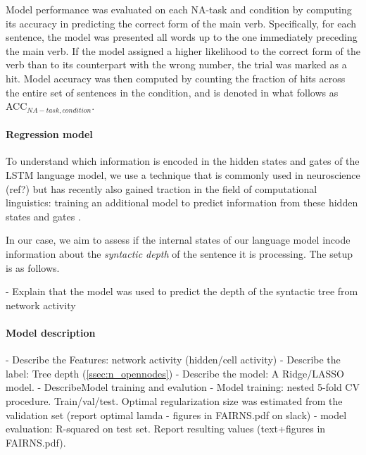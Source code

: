 Model performance was evaluated on each NA-task and condition by computing its accuracy in predicting the correct form of the main verb. Specifically, for each sentence, the model was presented all words up to the one immediately preceding the main verb. If the model assigned a higher likelihood to the correct form of the verb than to its counterpart with the wrong number, the trial was marked as a hit. Model accuracy was then computed by counting the fraction of hits across the entire set of sentences in the condition, and is denoted in what follows as ACC$_{NA-task, condition}$.


\paragraph{Regression model}\label{ssec:dc}  To understand which
information is encoded in the hidden states and gates of the LSTM
language model, we use a technique that is commonly used in
neuroscience (ref?) but has recently also gained traction in the field
of computational linguistics: training an additional model to predict
information from these hidden states and gates
\cite{Adi:etal:2017,Hupkes:etal:2017}.

In our case, we aim to assess if the internal states of our language model incode information about the \textit{syntactic depth} of the sentence it is processing.
The setup is as follows.

- Explain that the model was used to predict the depth of the syntactic tree from network activity
\paragraph{Model description}
- Describe the Features: network activity (hidden/cell activity)
- Describe the label: Tree depth (\ref{ssec:n_opennodes})
- Describe the model: A Ridge/LASSO model.
- Describe{Model training and evalution}
- Model training: nested 5-fold CV procedure. Train/val/test. Optimal regularization size was estimated from the validation set (report optimal lamda - figures in FAIRNS.pdf on slack)
- model evaluation: R-squared on test set. Report resulting values (text+figures in FAIRNS.pdf). 


